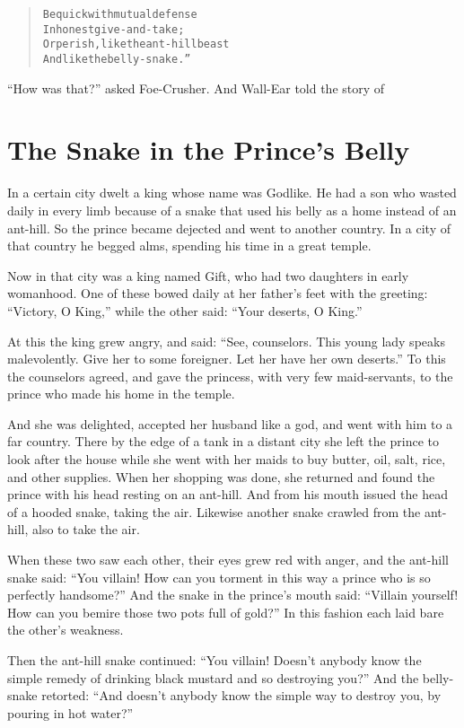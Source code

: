 \documentclass[article, twoside, 14pt]{memoir}
\renewenvironment{verbatim}{%
\begin{quote}%
\vskip -10pt%
\begin{alltt}\normalfont\large}{\end{alltt}%
\end{quote}%
\vskip -10pt
} %
\begin{document}
\begin{verbatim}
Be quick with mutual defense
    In honest give-and-take;
Or perish, like the ant-hill beast
    And like the belly-snake.”
\end{verbatim}
``How was that?'' asked Foe-Crusher. And Wall-Ear told the story
of

\chapter{The Snake in the Prince's Belly}

\label{s58}

In a certain city dwelt a king whose name was Godlike. He had a son
who wasted daily in every limb because of a snake that used his
belly as a home instead of an ant-hill. So the prince became
dejected and went to another country. In a city of that country he
begged alms, spending his time in a great temple.

Now in that city was a king named Gift, who had two daughters in
early womanhood. One of these bowed daily at her father's feet with
the greeting: ``Victory, O King,'' while the other said:
``Your deserts, O King.''

At this the king grew angry, and said:
``See, counselors. This young lady speaks malevolently. Give her to some foreigner. Let her have her own deserts.''
To this the counselors agreed, and gave the princess, with very few
maid-servants, to the prince who made his home in the temple.

And she was delighted, accepted her husband like a god, and went
with him to a far country. There by the edge of a tank in a distant
city she left the prince to look after the house while she
went with her maids to buy butter, oil, salt, rice, and other
supplies. When her shopping was done, she returned and found the
prince with his head resting on an ant-hill. And from his mouth
issued the head of a hooded snake, taking the air. Likewise another
snake crawled from the ant-hill, also to take the air.

When these two saw each other, their eyes grew red with anger, and
the ant-hill snake said:
``You villain! How can you torment in this way a prince who is so perfectly handsome?''
And the snake in the prince's mouth said:
``Villain yourself! How can you bemire those two pots full of gold?''
In this fashion each laid bare the other's weakness.

Then the ant-hill snake continued:
``You villain! Doesn't anybody know the simple remedy of drinking black mustard and so destroying you?''
And the belly-snake retorted:
``And doesn't anybody know the simple way to destroy you, by pouring in hot water?''
\end{document}
